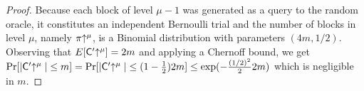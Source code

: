 \begin{proof}
    Because each block of level $\mu - 1$ was generated as a query to the random
    oracle, it constitutes an independent Bernoulli trial and the number of
    blocks in level $\mu$, namely $\pi\negthickspace\uparrow^\mu$, is a Binomial distribution
    with parameters $(4m, 1/2)$. Observing that $E[\mathsf{C}'\negthickspace\uparrow^\mu] = 2m$ and
    applying a Chernoff bound, we get
    $\Pr[|\mathsf{C}'\negthickspace\uparrow^\mu| \leq m]
    = \Pr[|\mathsf{C}'\negthickspace\uparrow^\mu| \leq (1 - \frac{1}{2})2m]
    \leq \exp(-\frac{(1/2)^2}{2} 2m)$ which is negligible in
    $m$.

\end{proof}
